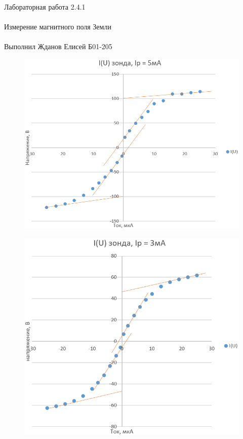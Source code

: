 \documentclass{astroedu-lab}
\begin{document}
\begin{problem}{\huge Лабораторная работа 2.4.1\\\\Измерение магнитного поля Земли\\\\Выполнил Жданов Елисей Б01-205}
\newpage

\begin{figure}[!h]
	\centering
	\includegraphics[width=1\textwidth]{5.png}
	\label{fig:boiler}
\end{figure}

\newpage

\begin{figure}[!h]
	\centering
	\includegraphics[width=1\textwidth]{3.png}
	\label{fig:boiler}
\end{figure}


\end{problem}
\end{document}
